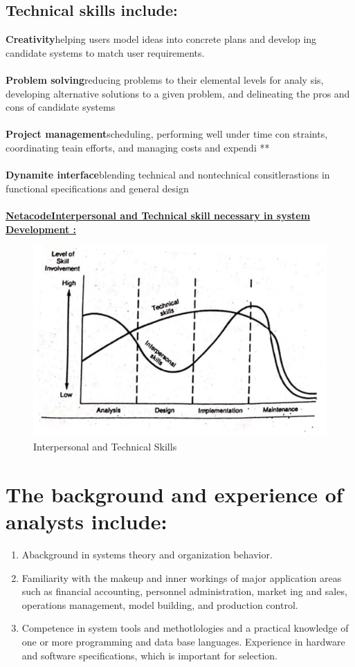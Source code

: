 \documentclass[a4paper,12pt]{report}
\begin{document}
\subsection{Technical skills include:}
\textbf{Creativity}helping users model ideas into concrete plans and develop ing candidate systems to match user requirements.\\ \\
\textbf{Problem solving}reducing problems to their elemental levels for analy sis, developing alternative solutions to a given problem, and delineating the pros and cons of candidate systems\\ \\
\textbf{Project management}scheduling, performing well under time con straints, coordinating teain efforts, and managing costs and expendi **\\ \\
\textbf{Dynamite interface}blending technical and nontechnical consitlerastions in functional specifications and general design\\ \\
\underline{\textbf{NetacodeInterpersonal and Technical skill necessary in system Development :}}

\begin{figure}[h]
	\centering
	\includegraphics[width=0.9\linewidth]{3_1}
	\caption{Interpersonal and Technical Skills}
	\label{fig:31}
\end{figure}
\section{The background and experience of analysts include:}
\begin{enumerate}
	\item Abackground in systems theory and organization behavior. 
	\item  Familiarity with the makeup and inner workings of major application areas such as financial accounting, personnel administration, market ing and sales, operations management, model building, and production control.
	\item  Competence in system tools and methotlologies and a practical knowledge of one or more programming and data base languages. Experience in hardware and software specifications, which is important for selection.
\end{enumerate}
\end{document}
